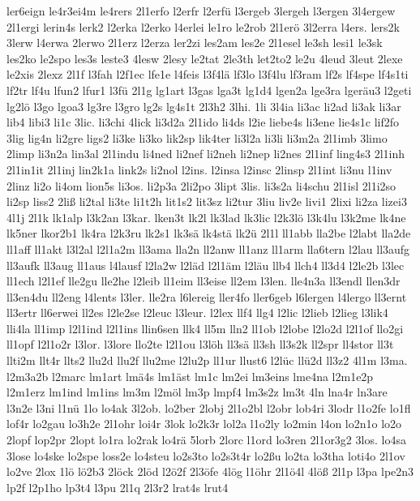 {ler6eign
le4r3ei4m
le4rers
2l1erfo
l2erfr
l2erfü
l3ergeb
3lergeh
l3ergen
3l4ergew
2l1ergi
lerin4s
lerk2
l2erka
l2erko
l4erlei
le1ro
le2rob
2l1erö
3l2erra
l4ers.
lers2k
3lerw
l4erwa
2lerwo
2l1erz
l2erza
ler2zi
les2am
les2e
2l1esel
le3sh
lesi1
le3sk
les2ko
le2spo
les3s
leste3
4lesw
2lesy
le2tat
2le3th
let2to2
le2u
4leud
3leut
2lexe
le2xis
2lexz
2l1f
l3fah
l2f1ec
lfe1e
l4feis
l3f4lä
lf3lo
l3f4lu
lf3ram
lf2s
lf4spe
lf4s1ti
lf2tr
lf4u
lfun2
lfur1
l3fü
2l1g
lg1art
l3gas
lga3t
lg1d4
lgen2a
lge3ra
lgeräu3
l2geti
lg2lö
l3go
lgoa3
lg3re
l3gro
lg2s
lg4s1t
2l3h2
3lhi.
1li
3l4ia
li3ac
li2ad
li3ak
li3ar
lib4
libi3
li1c
3lic.
li3chi
4lick
li3d2a
2l1ido
li4ds
l2ie
liebe4s
li3ene
lie4s1c
lif2fo
3lig
lig4n
li2gre
ligs2
li3ke
li3ko
lik2sp
lik4ter
li3l2a
li3li
li3m2a
2l1imb
3limo
2limp
li3n2a
lin3al
2l1indu
li4ned
li2nef
li2neh
li2nep
li2nes
2l1inf
ling4s3
2l1inh
2l1in1it
2l1inj
lin2k1a
link2s
li2nol
l2ins.
l2insa
l2insc
2linsp
2l1int
li3nu
l1inv
2linz
li2o
li4om
lion5s
li3os.
li2p3a
2li2po
3lipt
3lis.
li3s2a
li4schu
2l1isl
2l1i2so
li2sp
liss2
2liß
li2tal
li3te
li1t2h
lit1s2
lit3sz
li2tur
3liu
liv2e
livi1
2lixi
li2za
lizei3
4l1j
2l1k
lk1alp
l3k2an
l3kar.
lken3t
lk2l
lk3lad
lk3lic
l2k3lö
l3k4lu
l3k2me
lk4ne
lk5ner
lkor2b1
lk4ra
l2k3ru
lk2s1
lk3sä
lk4stä
lk2ü
2l1l
ll1abb
lla2be
l2labt
lla2de
ll1aff
ll1akt
l3l2al
l2l1a2m
ll3ama
lla2n
ll2anw
ll1anz
ll1arm
lla6tern
l2lau
ll3aufg
ll3aufk
ll3aug
ll1aus
l4lausf
l2la2w
l2läd
l2l1äm
l2läu
llb4
llch4
ll3d4
l2le2b
l3lec
ll1ech
l2l1ef
lle2gu
lle2he
l2leib
ll1eim
ll3eise
ll2em
l3len.
lle4n3a
ll3endl
llen3dr
ll3en4du
ll2eng
l4lents
l3ler.
lle2ra
l6lereig
ller4fo
ller6geb
l6lergen
l4lergo
ll3ernt
ll3ertr
ll6erwei
ll2es
l2le2se
l2leuc
l3leur.
l2lex
llf4
llg4
l2lic
l2lieb
l2lieg
l3lik4
lli4la
ll1imp
l2l1ind
l2l1ins
llin6sen
llk4
ll5m
lln2
ll1ob
l2lobe
l2lo2d
l2l1of
llo2gi
ll1opf
l2l1o2r
l3lor.
l3lore
llo2te
l2l1ou
l3löh
ll3sä
ll3sh
ll3s2k
ll2spr
ll4stor
ll3t
llti2m
llt4r
llts2
llu2d
llu2f
llu2me
l2lu2p
ll1ur
llust6
l2lüc
llü2d
ll3z2
4l1m
l3ma.
l2m3a2b
l2marc
lm1art
lmä4s
lm1äst
lm1c
lm2ei
lm3eins
lme4na
l2m1e2p
l2m1erz
lm1ind
lm1ins
lm3m
l2möl
lm3p
lmpf4
lm3s2z
lm3t
4ln
lna4r
ln3are
l3n2e
l3ni
l1nü
1lo
lo4ak
3l2ob.
lo2ber
2lobj
2l1o2bl
l2obr
lob4ri
3lodr
l1o2fe
lo1fl
lof4r
lo2gau
lo3h2e
2l1ohr
loi4r
3lok
lo2k3r
lol2a
l1o2ly
lo2min
l4on
lo2n1o
lo2o
2lopf
lop2pr
2lopt
lo1ra
lo2rak
lo4rä
5lorb
2lorc
l1ord
lo3ren
2l1or3g2
3los.
lo4sa
3lose
lo4ske
lo2spe
loss2e
lo4steu
lo2s3to
lo2s3t4r
lo2ßu
lo2ta
lo3tha
loti4o
2l1ov
lo2ve
2lox
1lö
lö2b3
2löck
2löd
l2ö2f
2l3öfe
4lög
l1öhr
2l1ö4l
4löß
2l1p
l3pa
lpe2n3
lp2f
l2p1ho
lp3t4
l3pu
2l1q
2l3r2
lrat4s
lrut4
}
